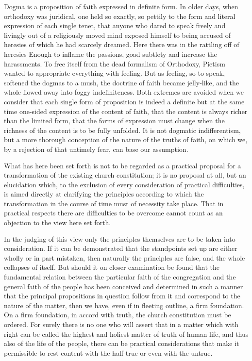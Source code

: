 \documentclass[12pt,a4paper,openany]{book}
\newcommand{\opage}[1]{\marginnote{\footnotesize\textit{[#1]}}}
\begin{document}
Dogma is a proposition of faith expressed in definite form.
In older days, when orthodoxy was juridical, one held
so exactly, so pettily to the form and literal expression of each single
\setcounter{footnote}{0}%
\opage{118}tenet, that anyone who dared to speak freely and livingly out of a religiously moved
mind exposed himself to being accused of heresies
of which he had scarcely dreamed. Here there was in the
rattling off of heresies Enough to inflame the
passions, goad subtlety and increase the harassments.
To free itself from the dead formalism
of Orthodoxy, Pietism wanted to appropriate everything with feeling.
But as feeling, so to speak, softened the dogmas
to a mush, the doctrine of faith became jelly-like, and the whole flowed away into
foggy indefiniteness. Both extremes are avoided
when we consider that each single form of proposition is indeed
a definite but at the same time one-sided expression of the content
of faith, that the content is always richer than the limited
form, that the forms of expression must change when the richness of the content
is to be fully unfolded. It is not
dogmatic indifferentism, but a more thorough conception
of the nature of the truths of faith, on which we, by a rejection
of that untimely fear, can base our assumption.


What has here been set forth is not to be regarded
as a practical proposal for a transformation of the existing
church constitution; it is no proposal at all, but
an elucidation which, to the exclusion of every consideration of
practical difficulties, is aimed directly at clarifying
the principles according to which the transformation in the course of time
must of necessity take place. That in practical respects
there are difficulties to be overcome cannot count as
an objection to the view here set forth.

In the judging of this view only the principles themselves
are to be taken into consideration. If it can be demonstrated that the standpoints set up
\setcounter{footnote}{0}%
\opage{119}are either wholly or in part mistaken, then naturally the
principles are false, and the whole collapses
of itself. But should it on closer
examination be found that the fundamental relation between the particular
faith of the congregation and the general faith of the people has been
conceived and determined in such a manner that the principal propositions in question follow from it and correspond to the nature
of the matter, then we have, even if in fleeting outline, a firm
foundation. On a firm foundation, in accord with truth,
the church constitution must be ordered. For surely there is
no one who will assert that in a matter
which with right can be called the highest and holiest matter of truth
of human life, and
thus also of the life of the people, there can be practical considerations that make it
permissible to rest content with the half-true or
even with the untrue.
\end{document}
